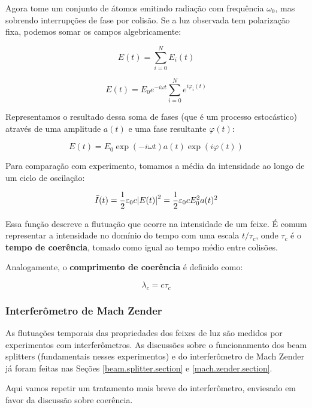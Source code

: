 \documentclass[12pt,a4paper]{report}
\begin{document}
Agora tome um conjunto de átomos emitindo radiação com frequência $\omega_0$, mas sobrendo interrupções de fase por colisão. Se a luz observada tem polarização fixa, podemos somar os campos algebricamente:

\begin{equation}
    E(t)=\sum^N_{i=0}{E_i(t)}
\end{equation}

\begin{equation*}
    E(t)=E_0e^{-i \omega t}\sum_{i=0}^N{e^{i\varphi_i(t)}}
\end{equation*}

Representamos o resultado dessa soma de fases (que é um processo estocástico) através de uma amplitude $a(t)$ e uma fase resultante $\varphi(t)$:

\begin{equation}
    E(t)=E_0\exp(-i \omega t)a(t)\exp(i\varphi(t))
\end{equation}

Para comparação com experimento, tomamos a média da intensidade ao longo de um ciclo de oscilação:

\begin{equation}
    \Bar{I}(t)=\frac{1}{2}\varepsilon_0c\abs{E(t)}^2=\frac{1}{2}\varepsilon_0cE_0^2a(t)^2
\end{equation}

Essa função descreve a flutuação que ocorre na intensidade de um feixe. É comum representar a intensidade no domínio do tempo com uma escala $t/\tau_c$, onde $\tau_c$ é o \textbf{tempo de coerência}, tomado como igual ao tempo médio entre colisões.

Analogamente, o \textbf{comprimento de coerência} é definido como:

\begin{equation}
    \lambda_c=c\tau_c
\end{equation}

\subsubsection{Interferômetro de Mach Zender}

As flutuações temporais das propriedades dos feixes de luz são medidos por experimentos com interferômetros. As discussões sobre o funcionamento dos beam splitters (fundamentais nesses experimentos) e do interferômetro de Mach Zender já foram feitas nas Seções \ref{beam.splitter.section} e \ref{mach.zender.section}.

Aqui vamos repetir um tratamento mais breve do interferômetro, enviesado em favor da discussão sobre coerência.
\end{document}
